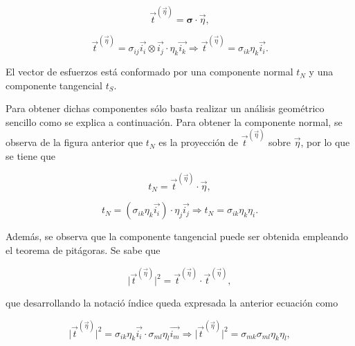 \documentclass{article}
\begin{document}
    \begin{equation}
        \vec{t}^{(\vec{\eta})} = \bm{\sigma} \cdot \vec{\eta},
    \end{equation}

    \begin{equation}
        \vec{t}^{(\vec{\eta})} = \sigma_{ij}\vec{i_{i}}\otimes\vec{i_{j}}\cdot\eta_{k}\vec{i_{k}}
        \Longrightarrow
        \vec{t}^{(\vec{\eta})} = \sigma_{ik}\eta_{k}\vec{i_{i}}.
    \end{equation}

    El vector de esfuerzos est\'{a} conformado por una componente normal $t_{N}$ y una
    componente tangencial $t_{S}$. 
    

    Para obtener dichas componentes s\'{o}lo basta
    realizar un an\'{a}lisis geom\'{e}trico sencillo como se explica a continuaci\'{o}n.
    Para obtener la componente normal, se observa de la figura anterior que $t_{N}$ es la
    proyecci\'{o}n de $\vec{t}^{(\vec{\eta})}$ sobre $\vec{\eta}$, por lo que se tiene que

    \begin{equation}
        t_{N} = \vec{t}^{(\vec{\eta})} \cdot \vec{\eta},
    \end{equation}

    \begin{equation}
        t_{N} = (\sigma_{ik}\eta_{k}\vec{i_{i}})\cdot\eta_{j}\vec{i_{j}}
        \Longrightarrow
        t_{N} = \sigma_{ik}\eta_{k}\eta_{i}.
    \end{equation}

    Adem\'{a}s, se observa que la componente tangencial puede ser obtenida empleando el
    teorema de pit\'{a}goras. Se sabe que

    \begin{equation}
        \lvert \vec{t}^{(\vec{\eta})} \rvert^2 = \vec{t}^{(\vec{\eta})} \cdot \vec{t}^{(\vec{\eta})},
    \end{equation}
    
    que desarrollando la notaci\'{o} \'{i}ndice queda expresada la anterior ecuaci\'{o}n como

    \begin{equation}
        \lvert \vec{t}^{(\vec{\eta})} \rvert^2 = \sigma_{ik}\eta_{k}\vec{i_{i}} \cdot
        \sigma_{ml}\eta_{l}\vec{i_{m}} \Rightarrow
        \lvert \vec{t}^{(\vec{\eta})} \rvert^2 = \sigma_{mk}\sigma_{ml}\eta_{k}\eta_{l},
    \end{equation}
\end{document}
